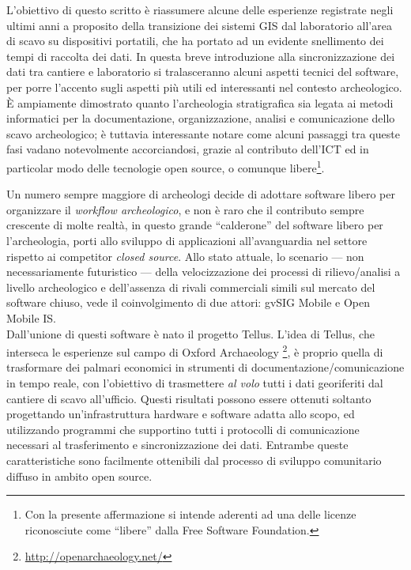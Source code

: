 \documentclass{paper}
\begin{document}
\pagebreak{}

	L'obiettivo di questo scritto \`{e} riassumere alcune delle esperienze
	registrate negli ultimi anni a proposito della transizione dei sistemi
	GIS dal laboratorio all'area di scavo su dispositivi portatili, che
	ha portato ad un evidente snellimento dei tempi di raccolta dei dati.
	In questa breve introduzione alla sincronizzazione dei dati tra cantiere
	e laboratorio si tralasceranno alcuni aspetti tecnici del software,
	per porre l'accento sugli aspetti più utili ed interessanti nel contesto
	archeologico.\\


	\`{E} ampiamente dimostrato quanto l'archeologia stratigrafica sia legata
	ai metodi informatici per la documentazione, organizzazione, analisi
	e comunicazione dello scavo archeologico; \`{e} tuttavia interessante
	notare come alcuni passaggi tra queste fasi vadano notevolmente accorciandosi,
	grazie al contributo dell'ICT ed in particolar modo delle tecnologie
	open source, o comunque libere\footnote{Con la presente affermazione si intende
	aderenti ad una delle licenze riconosciute come ``libere'' dalla Free Software Foundation.}.

	Un numero sempre maggiore di archeologi decide di adottare software
	libero per organizzare il \emph{workflow archeologico}, e non \`{e} raro
	che il contributo sempre crescente di molte realt\`{a}, in questo grande
	{}``calderone'' del software libero per l'archeologia, porti allo
	sviluppo di applicazioni all'avanguardia nel settore rispetto ai competitor
	\emph{closed source}. Allo stato attuale, lo scenario --- non necessariamente
	futuristico --- della velocizzazione dei processi di rilievo/analisi
	a livello archeologico e dell'assenza di rivali commerciali simili
	sul mercato del software chiuso, vede il coinvolgimento di due attori:
	gvSIG Mobile e Open Mobile IS.\\


	Dall'unione di questi software \`{e} nato il progetto Tellus. L'idea di
	Tellus, che interseca le esperienze sul campo di Oxford Archaeology \footnote{\url{http://openarchaeology.net/}},
	\`{e} proprio quella di trasformare dei palmari economici in strumenti
	di documentazione/comunicazione in tempo reale, con l'obiettivo di
	trasmettere \emph{al volo} tutti i dati georiferiti dal cantiere di
	scavo all'ufficio. Questi risultati possono essere ottenuti soltanto
	progettando un'infrastruttura hardware e software adatta allo scopo,
	ed utilizzando programmi che supportino tutti i protocolli di comunicazione
	necessari al trasferimento e sincronizzazione dei dati. Entrambe queste
	caratteristiche sono facilmente ottenibili dal processo di sviluppo
	comunitario diffuso in ambito open source.
\end{document}

